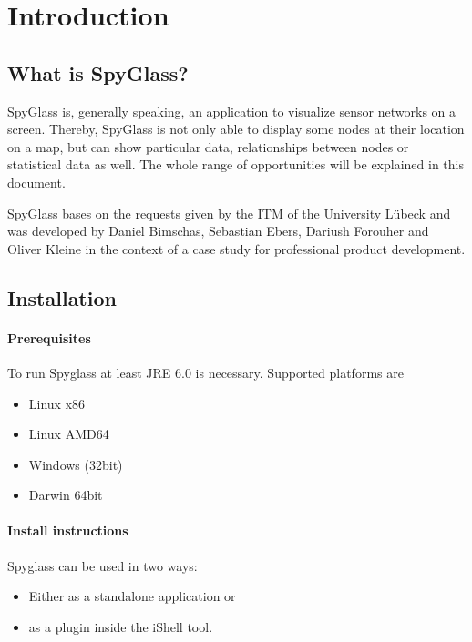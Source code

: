 \section{Introduction}
\label{section:s_introduction}

\subsection{What is SpyGlass?}
SpyGlass is, generally speaking, an application to visualize sensor networks on a screen. Thereby, SpyGlass is not only able to display
some nodes at their location on a map, but can show particular data, relationships between nodes or statistical data as well.
The whole range of opportunities will be explained in this document.

SpyGlass bases on the requests given by the ITM of the University Lübeck and was developed by Daniel Bimschas, Sebastian Ebers,
Dariush Forouher and Oliver Kleine in the context of a case study for professional product development.

\subsection{Installation}

\paragraph{Prerequisites}

To run Spyglass at least JRE 6.0 is necessary. Supported platforms are

\begin{itemize}
  \item{Linux x86}
  \item{Linux AMD64}
  \item{Windows (32bit)}
  \item{Darwin 64bit}
\end{itemize}

\paragraph{Install instructions}

Spyglass can be used in two ways:

\begin{itemize}
  \item{Either as a standalone application or}
  \item{as a plugin inside the iShell tool.}
\end{itemize}

